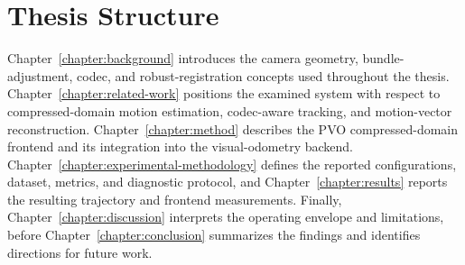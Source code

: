 \section{Thesis Structure}

Chapter~\ref{chapter:background} introduces the camera geometry, bundle-adjustment,
codec, and robust-registration concepts used throughout the thesis.
Chapter~\ref{chapter:related-work} positions the examined system with respect to
compressed-domain motion estimation, codec-aware tracking, and motion-vector
reconstruction. Chapter~\ref{chapter:method} describes the PVO compressed-domain
frontend and its integration into the visual-odometry backend.
Chapter~\ref{chapter:experimental-methodology} defines the reported configurations,
dataset, metrics, and diagnostic protocol, and Chapter~\ref{chapter:results} reports
the resulting trajectory and frontend measurements. Finally,
Chapter~\ref{chapter:discussion} interprets the operating envelope and limitations,
before Chapter~\ref{chapter:conclusion} summarizes the findings and identifies
directions for future work.
